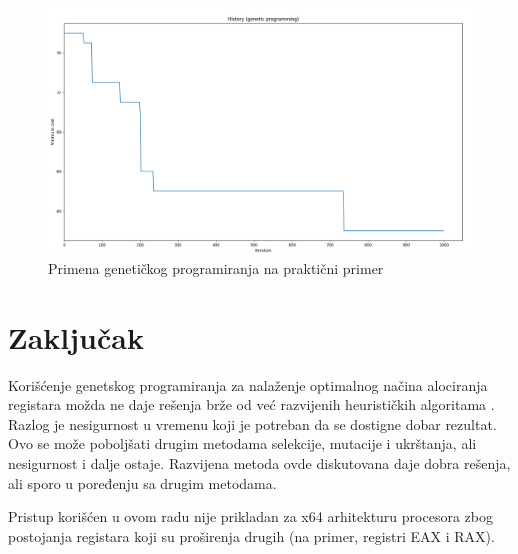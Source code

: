 \documentclass[a4paper, 12pt]{article}
\begin{document}
\begin{figure}
\centering
\includegraphics[scale=0.25]{Image/Snapshot/GeneticProgramming5}
\caption{Primena genetičkog programiranja na praktični primer}
\label{methodexample3}
\end{figure}

\newpage

\section{Zaključak}

Korišćenje genetskog programiranja za nalaženje optimalnog načina alociranja registara možda ne daje rešenja brže od već razvijenih heurističkih algoritama \cite{OnLocalRegisterAllocation} \cite{RegisterAllocationByPuzzleSolving}. Razlog je nesigurnost u vremenu koji je potreban da se dostigne dobar rezultat. Ovo se može poboljšati drugim metodama selekcije, mutacije i ukrštanja, ali nesigurnost i dalje ostaje. Razvijena metoda ovde diskutovana daje dobra rešenja, ali sporo u poređenju sa drugim metodama.


Pristup korišćen u ovom radu nije prikladan za x64 arhitekturu procesora zbog postojanja registara koji su proširenja drugih (na primer, registri EAX i RAX).

\newpage



\end{document}
